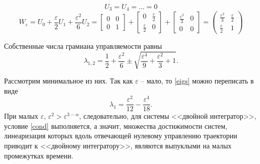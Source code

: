 \documentclass[../main.tex]{subfiles}
\begin{document}
 \begin{equation*}
	 U_3 = U_4 = \dots = 0
 \end{equation*}
 \begin{equation*}
	 W_{\varepsilon} = U_0 + \dfrac{\varepsilon}{2} U_1 + \dfrac{\varepsilon^2}{6} U_2 = \left[ {\begin{array}{*{20}{c}}
			 0&0\\
			 0&1
	 \end{array}}\right] + \left[ {\begin{array}{*{20}{c}}
			 0&\frac{\varepsilon}{2}\\
			 \frac{\varepsilon}{2}&0
	 \end{array}}\right] +\left[ {\begin{array}{*{20}{c}}
			 \frac{\varepsilon^2}{3}&0\\
			 0&0
	 \end{array}}\right] =  
	 \begin{pmatrix}
		 \frac{\varepsilon^2}{3}&\frac{\varepsilon}{2}\\
		 \frac{\varepsilon}{2}&1
	 \end{pmatrix} 
 \end{equation*}
 
 Собственные числа грамиана управляемости равны
 \begin{equation}\label{eigs}
	 \lambda_{1,2} = \dfrac{1}{2}+\dfrac{\varepsilon^2}{6} \pm \sqrt{\dfrac{\varepsilon^4}{9} + \dfrac{\varepsilon^2}{3} +1}.
 \end{equation}
 
 Рассмотрим минимальное из них. Так как $ \varepsilon $ -- мало, то \eqref{eigs} можно переписать в виде
 \begin{equation*}
	 \lambda_1 = \dfrac{\varepsilon^2}{12} - \dfrac{\varepsilon^4}{18}.
 \end{equation*} 
 При малых $ \varepsilon  $, $ \varepsilon^2 >  \varepsilon^{3-\alpha}  $, следовательно,  для системы <<двойной интегратор>>, условие \eqref{cond} выполняется, а значит, множества достижимости систем, линеаризация которых вдоль отвечающей нулевому управлению траектории приводит к <<двойному интегратору>>, являются выпуклыми на малых промежутках времени.
\end{document}
